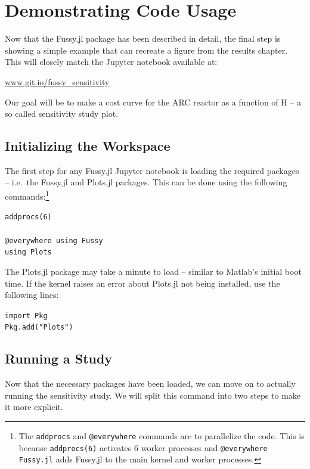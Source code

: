\section{Demonstrating Code Usage}

Now that the Fussy.jl package has been described in detail, the final step is showing a simple example that can recreate a figure from the results chapter. This will closely match the Jupyter notebook available at:

{\centering \href{https://git.io/fussy_sensitivity}{www.git.io/fussy\_sensitivity} \par }

Our goal will be to make a cost curve for the ARC reactor as a function of H -- a so called sensitivity study plot.

\subsection{Initializing the Workspace}

The first step for any Fussy.jl Jupyter notebook is loading the required packages -- i.e.\ the Fussy.jl and Plots.jl packages. This can be done using the following commands:\footnote{The \texttt{addprocs} and \texttt{@everywhere} commands are to parallelize the code. This is because \texttt{addprocs(6)} activates 6 worker processes and \texttt{@everywhere Fussy.jl} adds Fussy.jl to the main kernel and worker processes.}

\begin{addmargin}[1.5em]{1.5em}
\texttt{addprocs(6) \\ ~ \\
@everywhere using Fussy \\
using Plots
}
\end{addmargin}

The Plots.jl package may take a minute to load -- similar to Matlab's initial boot time. If the kernel raises an error about Plots.jl not being installed, use the following lines:

\begin{addmargin}[1.5em]{1.5em}
\texttt{import Pkg \\
Pkg.add("Plots")
}
\end{addmargin}

\subsection{Running a Study}

Now that the necessary packages have been loaded, we can move on to actually running the sensitivity study. We will split this command into two steps to make it more explicit. 

